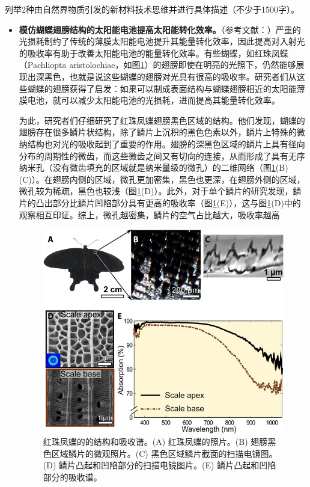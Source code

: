 \documentclass{assignment}
\begin{document}
\begin{ti}
    列举2种由自然界物质引发的新材料技术思维并进行具体描述（不少于1500字）。
\end{ti}
\begin{da}
    \begin{itemize}
        \item[(1)] \textbf{模仿蝴蝶翅膀结构的太阳能电池提高太阳能转化效率。}（参考文献：\cite{siddique2017bioinspired}）严重的光损耗制约了传统的薄膜太阳能电池提升其能量转化效率，因此提高对入射光的吸收率有助于改善太阳能电池的能量转化效率。有些蝴蝶，如红珠凤蝶（Pachliopta aristolochiae，如图\ref{Butterfly-Wings}）的翅膀即使在明亮的光照下，仍然能够展现出深黑色，也就是说这些蝴蝶的翅膀对光具有很高的吸收率。研究者们从这些蝴蝶的翅膀获得了启发：如果可以制成表面结构与蝴蝶翅膀相近的太阳能薄膜电池，就可以减少太阳能电池的光损耗，进而提高其能量转化效率。

        为此，研究者们仔细研究了红珠凤蝶翅膀黑色区域的结构。他们发现，蝴蝶的翅膀存在很多鳞片状结构，除了鳞片上沉积的黑色色素以外，鳞片上特殊的微纳结构也对光的吸收起到了重要的作用。翅膀的深黑色区域的鳞片上具有径向分布的周期性的微齿，而这些微齿之间又有切向的连接，从而形成了具有无序纳米孔（没有微齿填充的区域就是纳米量级的微孔）的二维网络（图\ref{Butterfly-Wings}(B)(C)）。在翅膀内侧的区域，微孔更加密集，黑色也更深，在翅膀外侧的区域，微孔较为稀疏，黑色也较浅（图\ref{Butterfly-Wings}(D)）。此外，对于单个鳞片的研究发现，鳞片的凸出部分比鳞片凹陷部分具有更高的吸收率（图\ref{Butterfly-Wings}(E)），这与图\ref{Butterfly-Wings}(D)中的观察相互印证。综上，微孔越密集，鳞片的空气占比越大，吸收率越高
        \begin{figure}[H]
            \centering
            \includegraphics[width=.6\columnwidth]{Butterfly-Wings.jpg}
            \caption{红珠凤蝶的的结构和吸收谱\cite{siddique2017bioinspired}。(A) 红珠凤蝶的照片。(B) 翅膀黑色区域鳞片的微观照片。(C) 黑色区域鳞片截面的扫描电镜图。(D) 鳞片凸起和凹陷部分的扫描电镜图片。(E) 鳞片凸起和凹陷部分的吸收谱。}
            \label{Butterfly-Wings}
        \end{figure}


\end{itemize}
\end{da}
\end{document}
